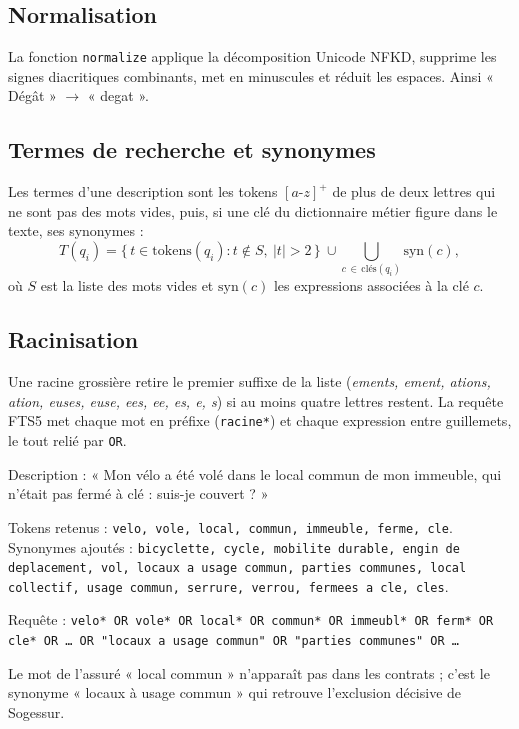 \documentclass[11pt,a4paper]{article}
\begin{document}
\subsection{Normalisation}
La fonction \texttt{normalize} applique la décomposition Unicode NFKD, supprime les signes
diacritiques combinants, met en minuscules et réduit les espaces. Ainsi
« Dégât » $\to$ « degat ».

\subsection{Termes de recherche et synonymes}
Les termes d'une description sont les tokens $[a\text{-}z]^+$ de plus de deux lettres qui ne sont pas
des mots vides, puis, si une clé du dictionnaire métier figure dans le texte, ses synonymes :
\[
T(q_i) = \{\, t \in \mathrm{tokens}(q_i) : t \notin S,\ |t|>2 \,\} \ \cup \bigcup_{c\,\in\,\text{clés}(q_i)} \mathrm{syn}(c),
\]
où $S$ est la liste des mots vides et $\mathrm{syn}(c)$ les expressions associées à la clé $c$.

\subsection{Racinisation}
Une racine grossière retire le premier suffixe de la liste
(\emph{ements, ement, ations, ation, euses, euse, ees, ee, es, e, s}) si au moins quatre lettres
restent. La requête FTS5 met chaque mot en préfixe (\texttt{racine*}) et chaque expression entre
guillemets, le tout relié par \texttt{OR}.

\begin{exemple}
Description : « Mon vélo a été volé dans le local commun de mon immeuble, qui n'était pas fermé à
clé : suis-je couvert ? »

Tokens retenus : \texttt{velo, vole, local, commun, immeuble, ferme, cle}.
Synonymes ajoutés : \texttt{bicyclette, cycle, mobilite durable, engin de deplacement, vol, locaux
a usage commun, parties communes, local collectif, usage commun, serrure, verrou, fermees a cle,
cles}.

Requête : \texttt{velo* OR vole* OR local* OR commun* OR immeubl* OR ferm* OR cle* OR \dots\ OR
"locaux a usage commun" OR "parties communes" OR \dots}

Le mot de l'assuré « local commun » n'apparaît pas dans les contrats ; c'est le synonyme
« locaux à usage commun » qui retrouve l'exclusion décisive de Sogessur.
\end{exemple}
\end{document}
